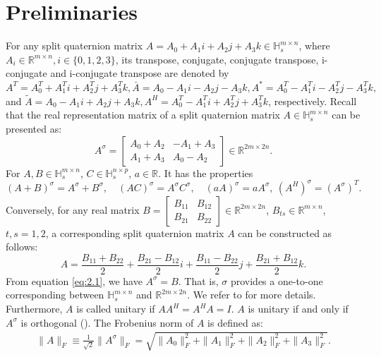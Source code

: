 \documentclass[3p]{elsarticle}
\numberwithin{equation}{section}
\begin{document}
\section{Preliminaries}
For any split quaternion matrix ${A}=A_{0}+A_{1}i + A_{2}j + A_{3}k \in\mathbb{H}_{s}^{m\times n}$, where $A_{i}\in\mathbb{R}^{m\times n}, i\in\{0,1,2,3\}$, its transpose, conjugate, conjugate transpose, i-conjugate and i-conjugate transpose are  denoted by 
 ${A}^T = A_0^T + A_1^Ti + A_2^Tj + A_3^Tk,\bar{{A}} = A_0 - A_1i - A_2j - A_3k, {A}^* = A_0^T - A_1^Ti - A_2^Tj - A_3^Tk,$ and
 $\tilde{A} = A_0 - A_1i + A_2j + A_3k,{A}^H = A_0^T - A_1^Ti + A_2^Tj + A_3^Tk$, respectively. Recall that the real representation matrix of a split quaternion matrix $A \in\mathbb{H}_{s}^{m\times n}$ can be presented as:
\begin{equation}\label{eq:2.1}
A^\sigma = \begin{bmatrix} A_0 + A_2 & -A_1 + A_3 \\ A_1 + A_3 & A_0 - A_2 \end{bmatrix} \in \mathbb{R}^{2m \times 2n}.
\end{equation}
For $A, B \in \mathbb{H}_s^{m \times n}$, $C \in \mathbb{H}_s^{n \times p}$, $a \in \mathbb{R}$. It has the properties
\begin{equation}\label{eq:2.2}
    (A + B)^\sigma = A^\sigma + B^\sigma, \quad (AC)^\sigma = A^\sigma C^\sigma, \quad (a A)^\sigma = a A^\sigma, \ (A^H)^\sigma = (A^\sigma)^T.
\end{equation}
Conversely, for any real matrix $B = \begin{bmatrix} B_{11} & B_{12} \\ B_{21} & B_{22} \end{bmatrix} \in \mathbb{R}^{2m \times 2n}$, $B_{ts} \in \mathbb{R}^{m \times n}$, $t, s = 1, 2$, a corresponding split quaternion matrix $A$ can be constructed as follows:
\begin{equation}\label{eq:2.3}
{A} = \frac{B_{11} + B_{22}}{2} + \frac{B_{21} - B_{12}}{2}i + \frac{B_{11} - B_{22}}{2}j + \frac{B_{21} + B_{12}}{2}k.
\end{equation}
From equation \eqref{eq:2.1}, we have ${A}^\sigma = B$. 
That is,  $\sigma$ provides a one-to-one corresponding between $\mathbb{H}_s^{m\times n}$ and $\mathbb{R}^{2m \times 2n}$. We refer to \cite{Gang2024} for more details. Furthermore,  $A$ is called unitary if $AA^H = A^H A = I$. $A$ is unitary if and only if  $A^\sigma$ is  orthogonal (\cite{Gang2024}).
 The Frobenius norm of $A$ is defined as: 
 \begin{align*}
     \| A \|_F \equiv \frac{1}{\sqrt{2}} \| A^\sigma \|_F = \sqrt{\| A_0 \|_F^2 + \| A_1 \|_F^2 + \| A_2 \|_F^2 + \| A_3 \|_F^2}.
\end{align*}

\end{document}

